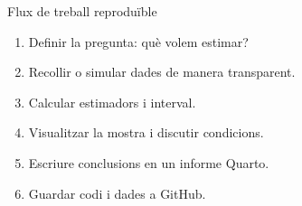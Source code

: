 \documentclass[10pt,aspectratio=169]{beamer}
\newcommand{\GitHub}{\textsf{GitHub}}
\begin{document}
\begin{frame}[fragile]{Flux de treball reproduïble}
\begin{enumerate}
  \item Definir la pregunta: què volem estimar?
  \item Recollir o simular dades de manera transparent.
  \item Calcular estimadors i interval.
  \item Visualitzar la mostra i discutir condicions.
  \item Escriure conclusions en un informe Quarto.
  \item Guardar codi i dades a \GitHub.
\end{enumerate}
\end{frame}
\end{document}
